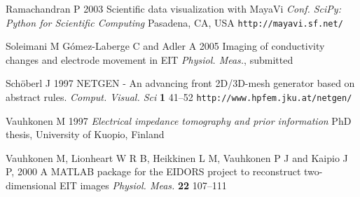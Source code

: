 \documentclass[12pt]{iopart}
\begin{document}
\begin{thebibliography}{99}
Ramachandran P 2003
Scientific data visualization with MayaVi
{\it Conf. SciPy: Python for Scientific Computing}
Pasadena, CA, USA
{\tt http://mayavi.sf.net/}

Soleimani M G\'omez-Laberge C and Adler A 2005
Imaging of conductivity changes and electrode movement in EIT
{\it Physiol. Meas.}, submitted

Sch\"oberl J 1997
NETGEN - An advancing front 2D/3D-mesh generator based on abstract rules.
{\it Comput. Visual. Sci} {\bf 1} 41--52
{\tt http://www.hpfem.jku.at/netgen/}

Vauhkonen M 
1997
{\it Electrical impedance tomography and prior information}
PhD thesis, University of Kuopio, Finland 

Vauhkonen M,
Lionheart W R B,
Heikkinen L M,
Vauhkonen P J and
Kaipio J P, 
2000
A MATLAB package for the EIDORS project to reconstruct
two-dimensional EIT images
{\it Physiol. Meas.} {\bf 22} 107--111 

\end{thebibliography}
\end{document}
